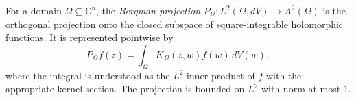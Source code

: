 
For a domain $\Omega\subseteq\mathbb C^n$, the \emph{Bergman projection} $P_\Omega:L^2(\Omega,dV)\to A^2(\Omega)$ is the orthogonal projection onto the closed subspace of square-integrable holomorphic functions. It is represented pointwise by
\[
P_\Omega f(z)=\int_\Omega K_\Omega(z,w)f(w)\,dV(w),
\]
where the integral is understood as the $L^2$ inner product of $f$ with the appropriate kernel section. The projection is bounded on $L^2$ with norm at most $1$.
